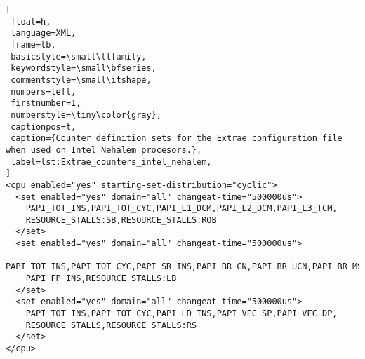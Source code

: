 \begin{lstlisting}[
 float=h,
 language=XML,
 frame=tb,
 basicstyle=\small\ttfamily,
 keywordstyle=\small\bfseries,
 commentstyle=\small\itshape,
 numbers=left,
 firstnumber=1,
 numberstyle=\tiny\color{gray},
 captionpos=t,
 caption={Counter definition sets for the Extrae configuration file when used on Intel Nehalem procesors.},
 label=lst:Extrae_counters_intel_nehalem,
]
<cpu enabled="yes" starting-set-distribution="cyclic">
  <set enabled="yes" domain="all" changeat-time="500000us">
    PAPI_TOT_INS,PAPI_TOT_CYC,PAPI_L1_DCM,PAPI_L2_DCM,PAPI_L3_TCM,
    RESOURCE_STALLS:SB,RESOURCE_STALLS:ROB
  </set>
  <set enabled="yes" domain="all" changeat-time="500000us">
    PAPI_TOT_INS,PAPI_TOT_CYC,PAPI_SR_INS,PAPI_BR_CN,PAPI_BR_UCN,PAPI_BR_MSP,
    PAPI_FP_INS,RESOURCE_STALLS:LB
  </set>
  <set enabled="yes" domain="all" changeat-time="500000us">
    PAPI_TOT_INS,PAPI_TOT_CYC,PAPI_LD_INS,PAPI_VEC_SP,PAPI_VEC_DP,
    RESOURCE_STALLS,RESOURCE_STALLS:RS
  </set>
</cpu>
\end{lstlisting}
